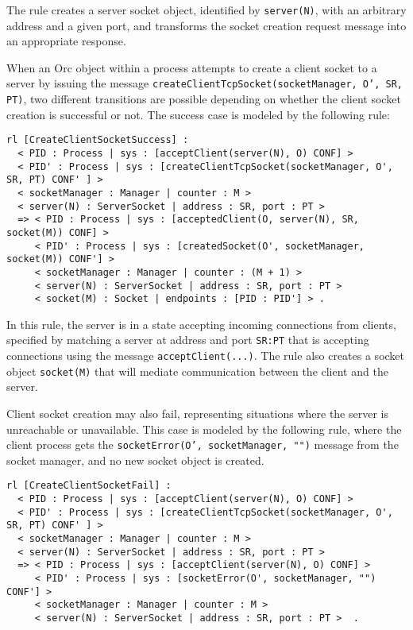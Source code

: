 \documentclass{eptcs}
\begin{document}
\noindent The rule creates a server socket object, identified by \texttt{server(N)}, with an arbitrary address and a given port, and transforms the socket creation request message into an appropriate response. 

When an Orc object within a process attempts to create a client socket to a server by issuing the message \texttt{createClientTcpSocket(socketManager, O', SR, PT)}, two different transitions are possible depending on whether the client socket creation is successful or not. The success case is modeled by the following rule:

\begin{small}
\begin{verbatim}
rl [CreateClientSocketSuccess] : 
  < PID : Process | sys : [acceptClient(server(N), O) CONF] >
  < PID' : Process | sys : [createClientTcpSocket(socketManager, O', SR, PT) CONF' ] >
  < socketManager : Manager | counter : M >
  < server(N) : ServerSocket | address : SR, port : PT > 
  => < PID : Process | sys : [acceptedClient(O, server(N), SR, socket(M)) CONF] >
     < PID' : Process | sys : [createdSocket(O', socketManager, socket(M)) CONF'] >
     < socketManager : Manager | counter : (M + 1) > 
     < server(N) : ServerSocket | address : SR, port : PT >
     < socket(M) : Socket | endpoints : [PID : PID'] > .
\end{verbatim}
\end{small}

\noindent In this rule, the server is in a state accepting incoming connections from clients, specified by matching a server at address and port \texttt{SR:PT} that is accepting connections using the message \texttt{acceptClient(...)}. The rule also creates a socket object \texttt{socket(M)} that will mediate communication between the client and the server. 

Client socket creation may also fail, representing situations where the server is unreachable or unavailable. This case is modeled by the following rule, where the client process gets the \texttt{socketError(O', socketManager, "")} message from the socket manager, and no new socket object is created.  
 
\begin{small}
\begin{verbatim}
rl [CreateClientSocketFail] : 
  < PID : Process | sys : [acceptClient(server(N), O) CONF] >
  < PID' : Process | sys : [createClientTcpSocket(socketManager, O', SR, PT) CONF' ] >
  < socketManager : Manager | counter : M >
  < server(N) : ServerSocket | address : SR, port : PT >
  => < PID : Process | sys : [acceptClient(server(N), O) CONF] >
     < PID' : Process | sys : [socketError(O', socketManager, "") CONF'] >
     < socketManager : Manager | counter : M >
     < server(N) : ServerSocket | address : SR, port : PT >  . 
\end{verbatim}
\end{small}
 
\end{document}
